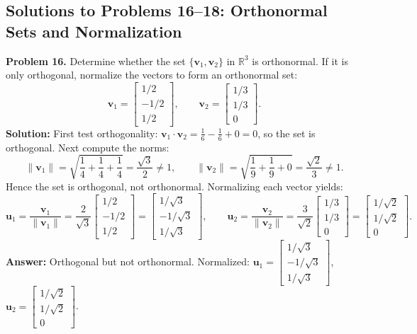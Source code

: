 \documentclass[11pt, letterpaper]{article}
\theoremstyle{definition}
\theoremstyle{remark}
\begin{document}
\subsection{Solutions to Problems 16--18: Orthonormal Sets and Normalization}

\textbf{Problem 16.} Determine whether the set $\{\mathbf{v}_1, \mathbf{v}_2\}$ in $\mathbb{R}^3$ is orthonormal. If it is only orthogonal, normalize the vectors to form an orthonormal set:
\[
\mathbf{v}_1 = \begin{bmatrix} 1/2 \\ -1/2 \\ 1/2 \end{bmatrix}, \qquad
\mathbf{v}_2 = \begin{bmatrix} 1/3 \\ 1/3 \\ 0 \end{bmatrix}.
\]
\textbf{Solution:} First test orthogonality: $\mathbf{v}_1 \cdot \mathbf{v}_2 = \frac{1}{6} - \frac{1}{6} + 0 = 0$, so the set is orthogonal. Next compute the norms:
\[
\|\mathbf{v}_1\| = \sqrt{\frac{1}{4} + \frac{1}{4} + \frac{1}{4}} = \frac{\sqrt{3}}{2} \neq 1, \qquad
\|\mathbf{v}_2\| = \sqrt{\frac{1}{9} + \frac{1}{9} + 0} = \frac{\sqrt{2}}{3} \neq 1.
\]
Hence the set is orthogonal, not orthonormal. Normalizing each vector yields:
\[
\mathbf{u}_1 = \frac{\mathbf{v}_1}{\|\mathbf{v}_1\|} = \frac{2}{\sqrt{3}}\begin{bmatrix} 1/2 \\ -1/2 \\ 1/2 \end{bmatrix} = \begin{bmatrix} 1/\sqrt{3} \\ -1/\sqrt{3} \\ 1/\sqrt{3} \end{bmatrix}, \qquad
\mathbf{u}_2 = \frac{\mathbf{v}_2}{\|\mathbf{v}_2\|} = \frac{3}{\sqrt{2}}\begin{bmatrix} 1/3 \\ 1/3 \\ 0 \end{bmatrix} = \begin{bmatrix} 1/\sqrt{2} \\ 1/\sqrt{2} \\ 0 \end{bmatrix}.
\]
\textbf{Answer:} Orthogonal but not orthonormal. Normalized: $\mathbf{u}_1 = \begin{bmatrix} 1/\sqrt{3} \\ -1/\sqrt{3} \\ 1/\sqrt{3} \end{bmatrix}$, $\mathbf{u}_2 = \begin{bmatrix} 1/\sqrt{2} \\ 1/\sqrt{2} \\ 0 \end{bmatrix}$.
\end{document}
